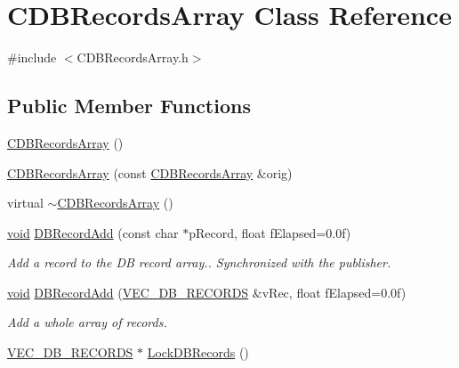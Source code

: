 \hypertarget{class_c_d_b_records_array}{\section{\-C\-D\-B\-Records\-Array \-Class \-Reference}
\label{class_c_d_b_records_array}
}


{\ttfamily \#include $<$\-C\-D\-B\-Records\-Array.\-h$>$}

\subsection*{\-Public \-Member \-Functions}
\begin{DoxyCompactItemize}
\item 
\hyperlink{class_c_d_b_records_array_a1a34c7690fc2d0f4eff418a39c0d0985}{\-C\-D\-B\-Records\-Array} ()
\item 
\hyperlink{class_c_d_b_records_array_a2956116f14e5fa19a6386ffd23053c4d}{\-C\-D\-B\-Records\-Array} (const \hyperlink{class_c_d_b_records_array}{\-C\-D\-B\-Records\-Array} \&orig)
\item 
virtual \hyperlink{class_c_d_b_records_array_a9b9b7ecd895df030784764291f57537d}{$\sim$\-C\-D\-B\-Records\-Array} ()
\item 
\hyperlink{_cpclient_8h_a6464f7480a0fd0ee170cba12b2c0497f}{void} \hyperlink{class_c_d_b_records_array_ae71da68787e56a916aa4149abd6912b1}{\-D\-B\-Record\-Add} (const char $\ast$p\-Record, float f\-Elapsed=0.\-0f)
\begin{DoxyCompactList}\small\item\em \-Add a record to the \-D\-B record array.. \-Synchronized with the publisher. \end{DoxyCompactList}\item 
\hyperlink{_cpclient_8h_a6464f7480a0fd0ee170cba12b2c0497f}{void} \hyperlink{class_c_d_b_records_array_a7442b3cefd55b855f6128331b87d1bc5}{\-D\-B\-Record\-Add} (\hyperlink{_c_d_b_records_array_8h_a32e3940d41c32d8e161b8775f6c4296a}{\-V\-E\-C\-\_\-\-D\-B\-\_\-\-R\-E\-C\-O\-R\-D\-S} \&v\-Rec, float f\-Elapsed=0.\-0f)
\begin{DoxyCompactList}\small\item\em \-Add a whole array of records. \end{DoxyCompactList}\item 
\hyperlink{_c_d_b_records_array_8h_a32e3940d41c32d8e161b8775f6c4296a}{\-V\-E\-C\-\_\-\-D\-B\-\_\-\-R\-E\-C\-O\-R\-D\-S} $\ast$ \hyperlink{class_c_d_b_records_array_a04a84400f1419abd3dca2cb3834f7071}{\-Lock\-D\-B\-Records} ()

\end{DoxyCompactItemize}
